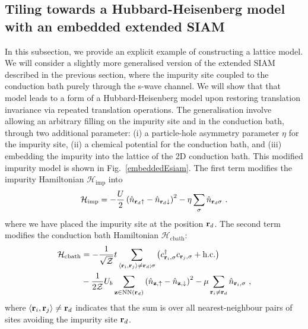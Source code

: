\documentclass[reprint,hidelinks,onecolumn]{revtex4-2}
\begin{document}
\subsection{Tiling towards a Hubbard-Heisenberg model with an embedded extended SIAM}
In this subsection, we provide an explicit example of constructing a lattice model. We will consider a slightly more generalised version of the extended SIAM described in the previous section, where the impurity site coupled to the conduction bath purely through the s-wave channel. We will show that that model leads to a form of a Hubbard-Heisenberg model upon restoring translation invariance via repeated translation operations. The generalisation involve allowing an arbitrary filling on the impurity site and in the conduction bath, through two additional parameter: (i) a particle-hole asymmetry parameter \(\eta\) for the impurity site, (ii) a chemical potential for the conduction bath, and (iii) embedding the impurity into the lattice of the 2D conduction bath. This modified impurity model is shown in Fig.~\ref{embeddedEsiam}. The first term modifies the impurity Hamiltonian \(\mathcal{H}_\text{imp}\) into
\begin{equation}\begin{aligned}\label{onsiteHamiltonian}
	\mathcal{H}_\text{imp} = -\frac{U}{2}\left(\hat n_{{\bf r}_d \uparrow} - \hat n_{{\bf r}_d \downarrow} \right)^2 - \eta\sum_\sigma \hat n_{{\bf r}_d\sigma}~.
\end{aligned}\end{equation}
where we have placed the impurity site at the position \({\bf r}_d\). The second term modifies the conduction bath Hamiltonian \(\mathcal{H}_\text{cbath}\):
\begin{equation}\begin{aligned}\label{bathHamiltonian}
	\mathcal{H}_\text{cbath} &= -\frac{1}{\sqrt\mathcal{Z}}t\sum_{\left<{\bf r}_i, {\bf r}_j\right>\neq{\bf r}_d;\sigma}\left(c^\dagger_{{\bf r}_i,\sigma}c_{{\bf r}_j,\sigma} + \text{h.c.}\right)\\
							 &- \frac{1}{2 \mathcal{Z}}U_b\sum_{{\bf z}\in\text{NN}({\bf r}_d)}\left(\hat n_{{\bf z}, \uparrow} - \hat n_{{\bf z}, \downarrow}\right)^2 - \mu \sum_{{\bf r}_i \neq {\bf r}_d}\hat n_{{\bf r}_i,\sigma}~,
\end{aligned}\end{equation}
where \(\left<{\bf r}_i, {\bf r}_j\right>\neq {\bf r}_d\) indicates that the sum is over all nearest-neighbour pairs of sites avoiding the impurity site \({\bf r}_d\).
\end{document}
